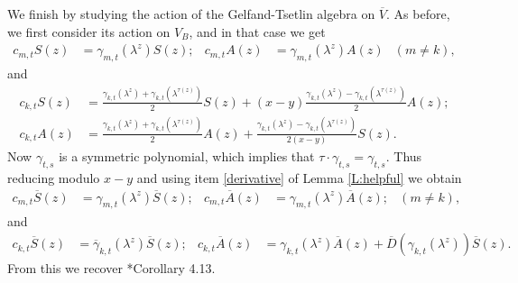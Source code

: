 \documentclass[11pt,fleqn]{article}
\begin{document}
We finish by studying the action of the Gelfand-Tsetlin algebra on $\overline 
V$. As before, we first consider its action on $V_B$, and in that case we get
\begin{align*}
c_{m,t} S(z)
	&= \gamma_{m,t}(\lambda^z)S(z); 
&c_{m,t} A(z)
	&= \gamma_{m,t}(\lambda^z)A(z) 
	&(m \neq k),
\end{align*}
and
\begin{align*}
c_{k,t} S(z)
	&= \frac{\gamma_{k,t}(\lambda^z) + \gamma_{k,t}(\lambda^{\tau(z)})}{2} S(z)
		+ (x-y)\frac{\gamma_{k,t}(\lambda^z) - \gamma_{k,t}(\lambda^{\tau(z)})}
		{2}A(z); \\
c_{k,t} A(z)
	&= \frac{\gamma_{k,t}(\lambda^z) + \gamma_{k,t}(\lambda^{\tau(z)})}{2}A(z)
		+ \frac{\gamma_{k,t}(\lambda^z) - \gamma_{k,t}(\lambda^{\tau(z)})}
		{2(x-y)}S(z).
\end{align*}
Now $\gamma_{t,s}$ is a symmetric polynomial, which implies that $\tau \cdot 
\gamma_{t,s} = \gamma_{t,s}$. Thus reducing modulo $x-y$ and using item 
\ref{derivative} of Lemma \ref{L:helpful} we obtain
\begin{align*}
c_{m,t} \overline S(z)
	&= \gamma_{m,t}(\lambda^z) \overline S(z);
&c_{m,t} \overline A(z)
	&= \gamma_{m,t}(\lambda^z) \overline A(z); 
	&(m \neq k),
\end{align*}
and
\begin{align*}
c_{k,t} \overline S(z)
	&= \overline \gamma_{k,t}(\lambda^z) \overline S(z); 
&c_{k,t} \overline A(z)
	&= \gamma_{k,t}(\lambda^z) \overline A(z)
		+ \overline D(\gamma_{k,t}(\lambda^z)) \overline S(z).
\end{align*}
From this we recover \cite{FGR-singular-gt}*{Corollary 4.13}. 

\begin{bibdiv}
\begin{biblist}
\end{biblist}
\end{bibdiv}
\end{document}
